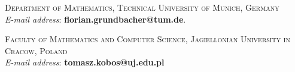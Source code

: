 \documentclass[12pt,a4paper]{article}
\theoremstyle{definition}
\begin{document}
\bigskip

\textsc{Department of Mathematics, Technical University of Munich, Germany} \\
\textit{E-mail address}: \textbf{florian.grundbacher@tum.de}.

\vskip 0.2in

\textsc{Faculty of Mathematics and Computer Science, Jagiellonian University in Cracow, Poland} \\
\textit{E-mail address}: \textbf{tomasz.kobos@uj.edu.pl}

\vfill\eject
\end{document}

